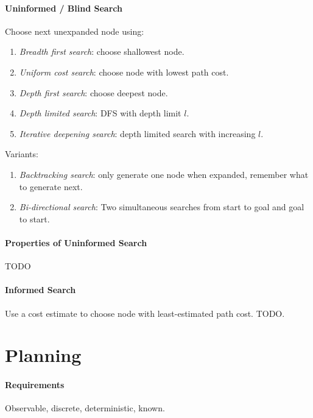 \documentclass[twocolumn,english]{article}
\begin{document}
\paragraph{Uninformed / Blind Search}

Choose next unexpanded node using:
\begin{enumerate}
\item \emph{Breadth first search}: choose shallowest node.
\item \emph{Uniform cost search}: choose node with lowest path cost.
\item \emph{Depth first search}: choose deepest node.
\item \emph{Depth limited search}: DFS with depth limit $l$.
\item \emph{Iterative deepening search}: depth limited search with increasing
$l$.
\end{enumerate}
Variants:
\begin{enumerate}
\item \emph{Backtracking search}: only generate one node when expanded,
remember what to generate next.
\item \emph{Bi-directional search}: Two simultaneous searches from start
to goal and goal to start.
\end{enumerate}

\paragraph{Properties of Uninformed Search}

TODO

\paragraph{Informed Search}

Use a cost estimate to choose node with least-estimated path cost.
TODO.

\section{Planning}

\paragraph{Requirements}

Observable, discrete, deterministic, known.
\end{document}
